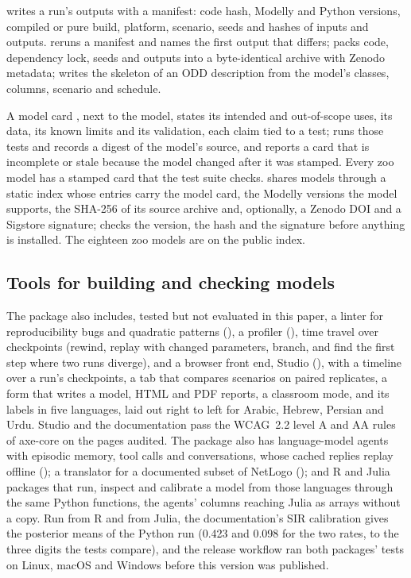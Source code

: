  writes a run's outputs with a manifest: code hash, Modelly and Python
versions, compiled or pure build, platform, scenario, seeds and hashes of inputs and outputs.
 reruns a manifest and names the first output that differs;
 packs code, dependency lock, seeds and outputs into a byte-identical
archive with Zenodo metadata;  writes the skeleton of an ODD description
\citep{grimm2020odd} from the model's classes, columns, scenario and schedule.

A model card \citep{mitchell2019model},  next to the model, states its intended
and out-of-scope uses, its data, its known limits and its validation, each claim tied to a test;
 runs those tests and records a digest of the model's source, and
 reports a card that is incomplete or stale because the model changed
after it was stamped. Every zoo model has a stamped card that the test suite checks.
 shares models through a static index whose entries carry the model card, the
Modelly versions the model supports, the SHA-256 of its source archive and, optionally, a
Zenodo DOI and a Sigstore signature;  checks the version, the hash and
the signature before anything is installed. The eighteen zoo models are on the public index.

\subsection{Tools for building and checking models}

The package also includes, tested but not evaluated in this paper, a linter for
reproducibility bugs and quadratic patterns (), a profiler
(), time travel over checkpoints (rewind, replay with changed parameters,
branch, and find the first step where two runs diverge), and a browser front end, Studio
(), with a timeline over a run's checkpoints, a tab that compares scenarios
on paired replicates, a form that writes a model, HTML and PDF reports, a classroom mode, and
its labels in five languages, laid out right to left for Arabic, Hebrew, Persian and Urdu. Studio and the documentation pass the
WCAG~2.2 level A and AA rules of axe-core on the pages audited. The package also has
language-model agents with episodic memory, tool calls and conversations, whose cached replies
replay offline (); a translator for a documented subset of NetLogo
(); and R and Julia packages that run, inspect and calibrate a model from
those languages through the same Python functions, the agents' columns reaching Julia as arrays
without a copy. Run from R and from Julia, the documentation's SIR calibration gives the
posterior means of the Python run (0.423 and 0.098 for the two rates, to the three digits the
tests compare), and the release workflow ran both packages' tests on Linux, macOS and Windows
before this version was published.

